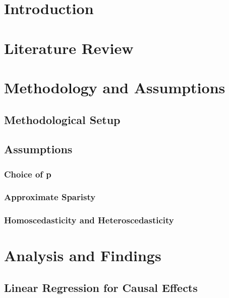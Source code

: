 \newpage
\tableofcontents

\newpage


    

\newpage
\section{Introduction}
\label{SDF}

\section{Literature Review}

\section{Methodology and Assumptions}

\subsection{Methodological Setup}

\subsection{Assumptions}

\subsubsection{Choice of p}

\subsubsection{Approximate Sparisty}

\subsubsection{Homoscedasticity and Heteroscedasticity}


\section{Analysis and Findings}
\subsection{Linear Regression for Causal Effects}

